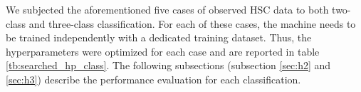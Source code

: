 \documentclass[useamsfonts]{pasj01}
\begin{document}
%
%
\begin{table}[htbp]
\label{tab:HSCsurvey_schedule}
\end{table}
%
%
We subjected the aforementioned five cases of observed HSC data to both two-class and three-class classification.
For each of these cases, the machine needs to be trained independently with a dedicated training dataset.
Thus, the hyperparameters were optimized for each case and are reported in table \ref{tb:searched_hp_class}.
The following subsections (subsection \ref{sec:h2} and \ref{sec:h3}) describe the performance evaluation for each classification.
%
%
\end{document}
